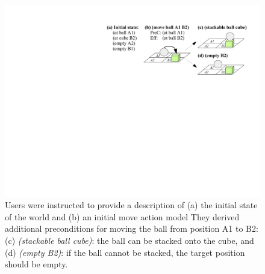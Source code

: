 \begin{figure}[t]
	\centering
	\includegraphics[width=0.75\linewidth]{figures/scenarios-exp1}
	\caption{Users were instructed to provide a description of (a) the initial state of the world and (b) an initial move action model
		They derived additional preconditions for moving the ball from position A1 to B2: (c) \textit{(stackable ball cube)}: the ball can be stacked onto the cube, and (d) \textit{(empty B2)}: if the ball cannot be stacked, the target position should be empty.}
	\label{fig:scenarios-exp1}
\end{figure}
